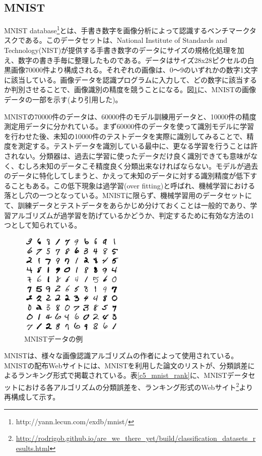 \subsection{MNIST}
MNIST database\footnote{http://yann.lecun.com/exdb/mnist/}とは、手書き数字を画像分析によって認識するベンチマークタスクである。このデータセットは、National Institute of Standards and Technology(NIST)が提供する手書き数字のデータにサイズの規格化処理を加え、数字の書き手毎に整理したものである。データはサイズ28x28ピクセルの白黒画像70000件より構成される\cite{lecun1998gradient-based}。それぞれの画像は、0〜9のいずれかの数字1文字に該当している。画像データを認識プログラムに入力して、どの数字に該当するか判別させることで、画像識別の精度を競うことになる。図\ref{c5_mnist_ex}に、MNISTの画像データの一部を示す(\cite{lecun1998gradient-based}より引用した)。\par
MNISTの70000件のデータは、60000件のモデル訓練用データと、10000件の精度測定用データに分かれている。まず60000件のデータを使って識別モデルに学習を行わせた後、未知の10000件のテストデータを実際に識別してみることで、精度を測定する。テストデータを識別している最中に、更なる学習を行うことは許されない。分類器は、過去に学習に使ったデータだけ良く識別できても意味がなく、むしろ未知のデータこそ精度良く分類出来なければならない。モデルが過去のデータに特化してしまうと、かえって未知のデータに対する識別精度が低下することもある。この低下現象は過学習(over fitting)と呼ばれ、機械学習における落とし穴の一つとなっている。MNISTに限らず、機械学習用のデータセットにて、訓練データとテストデータをあらかじめ分けておくことは一般的であり、学習アルゴリズムが過学習を防げているかどうか、判定するために有効な方法の1つとして知られている。\par
\begin{figure}[tbp]
 \begin{center}
  \includegraphics[width=50mm]{img/c5/mnist_ex}
 \end{center}
 \caption{MNISTデータの例}
 \label{c5_mnist_ex}
\end{figure}
MNISTは、様々な画像認識アルゴリズムの作者によって使用されている。MNISTの配布Webサイトには、MNISTを利用した論文のリストが、分類誤差によるランキング形式で掲載されている。表\ref{c5_mnist_rank}に、MNISTデータセットにおける各アルゴリズムの分類誤差を、ランキング形式のWebサイト\footnote{\label{c5_rank}\url{http://rodrigob.github.io/are_we_there_yet/build/classification_datasets_results.html}}より再構成して示す。

